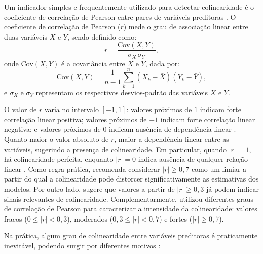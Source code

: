 Um indicador simples e frequentemente utilizado para detectar colinearidade é o coeficiente de correlação de Pearson entre pares de variáveis preditoras \cite{Carsten2012Collinearity}. O coeficiente de correlação de Pearson ($r$) mede o grau de associação linear entre duas variáveis $X$ e $Y$, sendo definido como:
\begin{equation}
	r = \frac{\text{Cov}(X,Y)}{\sigma_X \, \sigma_Y},
\end{equation}
onde $\text{Cov}(X,Y)$ é a covariância entre $X$ e $Y$, dada por:
\begin{equation}
	\text{Cov}(X,Y) = \frac{1}{n-1} \sum_{k=1}^{n} (X_k - \bar{X})(Y_k - \bar{Y}),
\end{equation}
e $\sigma_X$ e $\sigma_Y$ representam os respectivos desvios-padrão das variáveis $X$ e $Y$.

O valor de $r$ varia no intervalo $[-1,1]$: valores próximos de $1$ indicam forte correlação linear positiva; valores próximos de $-1$ indicam forte correlação linear negativa; e valores próximos de $0$ indicam ausência de dependência linear \cite{PearsonCorrelationCoefficient}. Quanto maior o valor absoluto de $r$, maior a dependência linear entre as variáveis, sugerindo a presença de colinearidade. Em particular, quando $|r| = 1$, há colinearidade perfeita, enquanto $|r| = 0$ indica ausência de qualquer relação linear \cite{kim2019multicollinearity}. Como regra prática,  recomenda considerar $|r| \geq 0{,}7$ como um limiar a partir do qual a colinearidade pode distorcer significativamente as estimativas dos modelos. Por outro lado,  sugere que valores a partir de $|r| \geq 0{,}3$ já podem indicar sinais relevantes de colinearidade. Complementarmente,  utilizou diferentes graus de correlação de Pearson para caracterizar a intensidade da colinearidade: valores fracos (\(0 \leq |r| < 0,3\)), moderados (\(0,3 \leq |r| < 0,7\)) e fortes (\(|r| \geq 0,7\)).

Na prática, algum grau de colinearidade entre variáveis preditoras é praticamente inevitável, podendo surgir por diferentes motivos \cite{Carsten2012Collinearity}:

